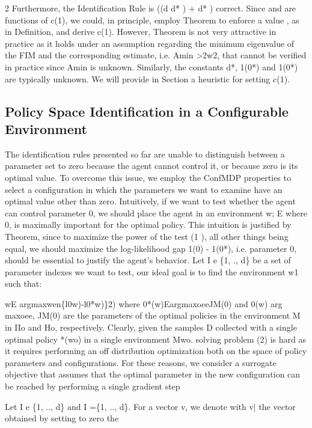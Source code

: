 \documentclass{article}
\begin{document}
\begin{paracol}{2}
Furthermore, the Identification Rule is ((d  d* ) + d* )
correct.
Since  and  are functions of c(1), we could, in principle, employ Theorem to enforce a value , as in Definition, and derive c(1). However, Theorem is not very attractive in practice as it holds under an assumption regarding the
minimum eigenvalue of the FIM and the corresponding estimate, i.e. Amin >2w2, that cannot be verified in practice
since Amin is unknown. Similarly, the constants d*, 1(0*)
and 1(0*) are typically unknown. We will provide in Section
a heuristic for setting c(1).


\subsection*{Policy Space Identification in a Configurable
Environment}


The identification rules presented so far are unable to distinguish between a parameter set to zero because the agent
cannot control it, or because zero is its optimal value. To
overcome this issue, we employ the ConfMDP properties
to select a configuration in which the parameters we want to
examine have an optimal value other than zero. Intuitively, if
we want to test whether the agent can control parameter 0,
we should place the agent in an environment w; E  where
0, is maximally important for the optimal policy. This intuition is justified by Theorem, since to maximize the power
of the test (1  ), all other things being equal, we should
maximize the log-likelihood gap 1(0) - 1(0*), i.e. parameter 0, should be essential to justify the agent's behavior. Let
I e \{1, ., d\} be a set of parameter indexes we want to test,
our ideal goal is to find the environment w1 such that:


wE argmaxwen\{l0w)-l0*w)\}2)
where 0*(w)EargmaxoeeJM(0) and 0(w)
arg maxoee, JM(0) are the parameters of the optimal
policies in the environment M in IIo and Ho, respectively. Clearly, given the samples D collected with a single optimal policy *(wo) in a single environment Mwo.
solving problem (2) is hard as it requires performing an off
distribution optimization both on the space of policy parameters and configurations. For these reasons, we consider a
surrogate objective that assumes that the optimal parameter
in the new configuration can be reached by performing a single gradient step


Let I e \{1, .., d\} and I =\{1, .., d\}\I. For a vector v, we
denote with v| the vector obtained by setting to zero the

\end{paracol}
\end{document}
